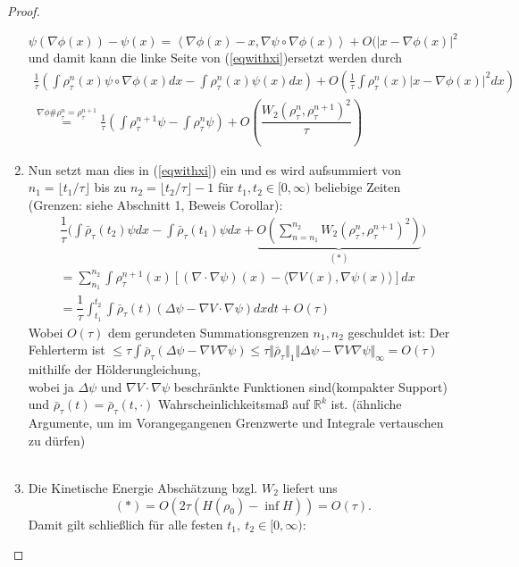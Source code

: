 \documentclass[11pt,a4paper,notitlepage]{scrreprt}
\newcommand{\RR}{\mathbb{R}}
\begin{document}
\begin{proof}
\begin{enumerate}
\begin{equation}
\psi(\nabla\phi(x))-\psi(x)=\left\langle\nabla\phi(x)-x,\nabla\psi\circ\nabla\phi(x)\right\rangle+O(\vert x-\nabla\phi(x)\vert^2
\end{equation}
und damit kann die linke Seite von (\ref{eqwithxi})ersetzt werden durch
\begin{align*}
\frac{1}{\tau}\left(\int \rho_\tau^n(x)\psi\circ\nabla\phi(x)dx-\int\rho_\tau^n(x)\psi(x)dx\right)+O\left(\frac{1}{\tau}\int\rho_\tau^n(x)\vert x-\nabla\phi(x)\vert^2dx\right)\\
\overset{\nabla\phi\#\rho_\tau^n=\rho_\tau^{n+1}}=\frac{1}{\tau}\left(\int\rho_\tau^{n+1}\psi-\int\rho_\tau^n\psi\right)+O\left(\dfrac{W_2(\rho_\tau^n,\rho_\tau^{n+1})^2}{\tau}\right)
\end{align*}
\item Nun setzt man dies in (\ref{eqwithxi}) ein und es wird aufsummiert von $n_1=\lfloor t_1/\tau\rfloor$ bis zu $n_2=\lfloor t_2/\tau\rfloor-1$ für $t_1,t_2\in[0,\infty)$ beliebige Zeiten (Grenzen: siehe Abschnitt 1, Beweis Corollar):
\begin{eqnarray}
\dfrac{1}{\tau}\Bigg(\int\bar{\rho}_\tau(t_2)\psi dx-\int\bar{\rho}_\tau(t_1)\psi dx+\underset{(*)}{\underbrace{O\left(\sum_{n=n_1}^{n_2}W_2(\rho_\tau^n,\rho_\tau^{n+1})^2\right)}}\Bigg)\\
=\sum_{n_1}^{n_2}\int\rho_\tau^{n+1}(x)\left[(\nabla\cdot \nabla\psi)(x)-\langle\nabla V(x),\nabla\psi(x)\rangle \right]dx \\=\dfrac{1}{\tau}\int_{t_1}^{t_2}\int\bar{\rho}_\tau(t)(\Delta\psi-\nabla V\cdot\nabla\psi)dx dt+O(\tau)
\end{eqnarray}
Wobei $O(\tau)$ dem gerundeten Summationsgrenzen $n_1,n_2$ geschuldet ist: Der Fehlerterm ist 
$\leq \tau \int\bar{\rho}_\tau(\Delta\psi-\nabla V\nabla\psi)\leq \tau\Vert\bar{\rho}_\tau\Vert_1\Vert\Delta\psi-\nabla V\nabla\psi\Vert_\infty=O(\tau)$ mithilfe der Hölderungleichung,\\
wobei ja $\Delta\psi$ und $\nabla V\cdot\nabla\psi$  beschränkte Funktionen sind(kompakter Support) und $\bar{\rho}_\tau(t)=\bar{\rho}_\tau(t,\cdot)$ Wahrscheinlichkeitsmaß auf $\RR^k$ ist. (ähnliche Argumente, um im Vorangegangenen Grenzwerte und Integrale vertauschen zu dürfen)\\\\
\item Die Kinetische Energie Abschätzung bzgl. $W_2$ liefert uns 
\[(*)=O(2\tau(H(\rho_0)-\inf H))=O(\tau).\]
Damit gilt schließlich für alle festen $t_1,~t_2\in [0,\infty)$:

\end{enumerate}
\end{proof}
\end{document}
